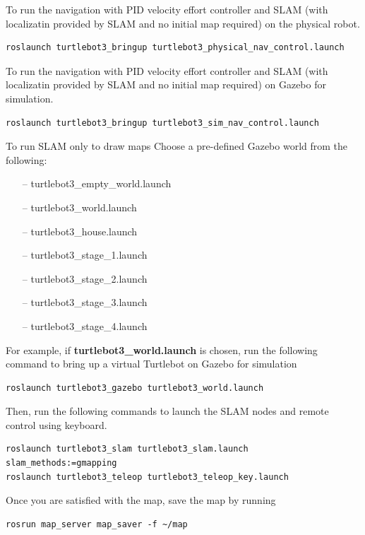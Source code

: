 \documentclass[12]{article}
\begin{document}
To run the navigation with PID velocity effort controller and SLAM (with localizatin provided by SLAM and no initial map required) on the physical robot. 
\begin{lstlisting}[style=bash]
roslaunch turtlebot3_bringup turtlebot3_physical_nav_control.launch 
\end{lstlisting}

To run the navigation with PID velocity effort controller and SLAM (with localizatin provided by SLAM and no initial map required) on Gazebo for simulation.  
\begin{lstlisting}[style=bash]
roslaunch turtlebot3_bringup turtlebot3_sim_nav_control.launch 
\end{lstlisting}

To run SLAM only to draw maps
Choose a pre-defined Gazebo world from the following:

\begin{itemize}
    \item[--] turtlebot3\_empty\_world.launch
    \item[--] turtlebot3\_world.launch
    \item[--] turtlebot3\_house.launch
    \item[--] turtlebot3\_stage\_1.launch
    \item[--] turtlebot3\_stage\_2.launch
    \item[--] turtlebot3\_stage\_3.launch 
    \item[--] turtlebot3\_stage\_4.launch
\end {itemize}
For example, if \textbf{turtlebot3\_world.launch} is chosen, run the following command to bring up a virtual Turtlebot on Gazebo for simulation
\begin{lstlisting}[style=bash]
roslaunch turtlebot3_gazebo turtlebot3_world.launch
\end{lstlisting}
\newpage
Then, run the following commands to launch the SLAM nodes and remote control using keyboard. 
\begin{lstlisting}[style=bash]
roslaunch turtlebot3_slam turtlebot3_slam.launch slam_methods:=gmapping
roslaunch turtlebot3_teleop turtlebot3_teleop_key.launch
\end{lstlisting}
Once you are satisfied with the map, save the map by running
\begin{lstlisting}[style=bash]
rosrun map_server map_saver -f ~/map
\end{lstlisting}
\end{document}
